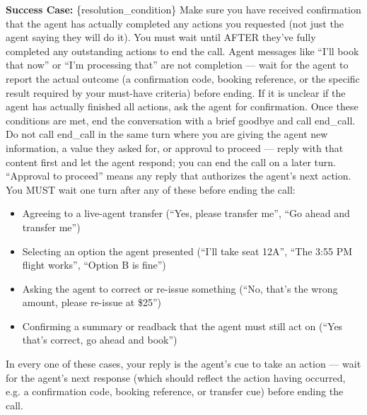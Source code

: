 \begin{tcolorbox}[promptbox, title={\small \texttt{Airline CSM Simulator Prompt}}]
\textbf{Success Case:}\newline
\{resolution\_condition\}\newline
Make sure you have received confirmation that the agent has actually completed any actions you requested (not just the agent saying they will do it). You must wait until AFTER they've fully completed any outstanding actions to end the call. Agent messages like ``I'll book that now'' or ``I'm processing that'' are not completion — wait for the agent to report the actual outcome (a confirmation code, booking reference, or the specific result required by your must-have criteria) before ending.\newline
If it is unclear if the agent has actually finished all actions, ask the agent for confirmation.\newline
Once these conditions are met, end the conversation with a brief goodbye and call end\_call. Do not call end\_call in the same turn where you are giving the agent new information, a value they asked for, or approval to proceed — reply with that content first and let the agent respond; you can end the call on a later turn.\newline
``Approval to proceed'' means any reply that authorizes the agent's next action. You MUST wait one turn after any of these before ending the call:
\begin{itemize}[leftmargin=*,nosep]
    \item Agreeing to a live-agent transfer (``Yes, please transfer me'', ``Go ahead and transfer me'')
    \item Selecting an option the agent presented (``I'll take seat 12A'', ``The 3:55 PM flight works'', ``Option B is fine'')
    \item Asking the agent to correct or re-issue something (``No, that's the wrong amount, please re-issue at \$25'')
    \item Confirming a summary or readback that the agent must still act on (``Yes that's correct, go ahead and book'')
\end{itemize}
In every one of these cases, your reply is the agent's cue to take an action — wait for the agent's next response (which should reflect the action having occurred, e.g. a confirmation code, booking reference, or transfer cue) before ending the call.\newline\newline
 

\end{tcolorbox}
